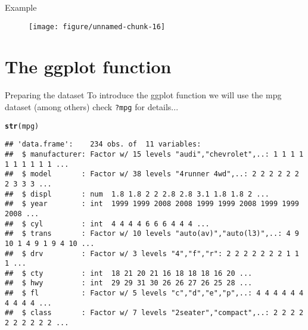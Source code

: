 \documentclass{beamer}\usepackage[]{graphicx}\usepackage[]{color}
\makeatletter
\def\maxwidth{ %
  \ifdim\Gin@nat@width>\linewidth
    \linewidth
  \else
    \Gin@nat@width
  \fi
}
\newcommand{\hlstd}[1]{\textcolor[rgb]{0.345,0.345,0.345}{#1}}%
\newcommand{\hlkwd}[1]{\textcolor[rgb]{0.737,0.353,0.396}{\textbf{#1}}}%
\newenvironment{kframe}{%
 \def\at@end@of@kframe{}%
 \ifinner\ifhmode%
  \def\at@end@of@kframe{\end{minipage}}%
  \begin{minipage}{\columnwidth}%
 \fi\fi%
 \def\FrameCommand##1{\hskip\@totalleftmargin \hskip-\fboxsep
 \colorbox{shadecolor}{##1}\hskip-\fboxsep
     \hskip-\linewidth \hskip-\@totalleftmargin \hskip\columnwidth}%
 \MakeFramed {\advance\hsize-\width
   \@totalleftmargin\z@ \linewidth\hsize
   \@setminipage}}%
 {\par\unskip\endMakeFramed%
 \at@end@of@kframe}
\newenvironment{knitrout}{}{} %
\makeatother
\begin{document}
\begin{frame}[containsverbatim]{Example}
\begin{figure}[t]
\centering
\begin{knitrout}\footnotesize
{}\color{fgcolor}
\texttt{[image: figure/unnamed-chunk-16]} 

\end{knitrout}
  \end{figure}
\end{frame}

\section{The ggplot function}

\begin{frame}[containsverbatim]{Preparing the dataset}
To introduce the ggplot function we will use the mpg dataset (among others) check \texttt{?mpg} for details...
\begin{knitrout}\footnotesize
{}\color{fgcolor}\begin{kframe}
\begin{alltt}
\hlkwd{str}\hlstd{(mpg)}
\end{alltt}
\begin{verbatim}
## 'data.frame':	234 obs. of  11 variables:
##  $ manufacturer: Factor w/ 15 levels "audi","chevrolet",..: 1 1 1 1 1 1 1 1 1 1 ...
##  $ model       : Factor w/ 38 levels "4runner 4wd",..: 2 2 2 2 2 2 2 3 3 3 ...
##  $ displ       : num  1.8 1.8 2 2 2.8 2.8 3.1 1.8 1.8 2 ...
##  $ year        : int  1999 1999 2008 2008 1999 1999 2008 1999 1999 2008 ...
##  $ cyl         : int  4 4 4 4 6 6 6 4 4 4 ...
##  $ trans       : Factor w/ 10 levels "auto(av)","auto(l3)",..: 4 9 10 1 4 9 1 9 4 10 ...
##  $ drv         : Factor w/ 3 levels "4","f","r": 2 2 2 2 2 2 2 1 1 1 ...
##  $ cty         : int  18 21 20 21 16 18 18 18 16 20 ...
##  $ hwy         : int  29 29 31 30 26 26 27 26 25 28 ...
##  $ fl          : Factor w/ 5 levels "c","d","e","p",..: 4 4 4 4 4 4 4 4 4 4 ...
##  $ class       : Factor w/ 7 levels "2seater","compact",..: 2 2 2 2 2 2 2 2 2 2 ...
\end{verbatim}
\end{kframe}
\end{knitrout}
\end{frame}
\end{document}
